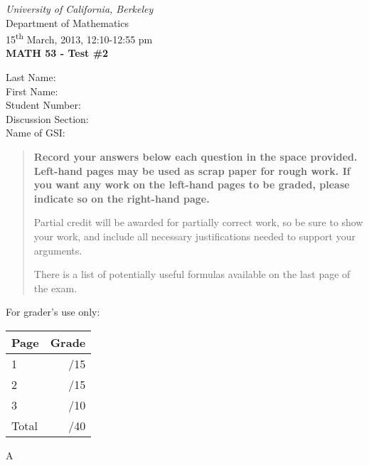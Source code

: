 \documentclass[12pt]{article}
\newcommand{\skipline}{\vspace{12pt}}
\begin{document}
\author{Instructor: Sean Fitzpatrick}
\thispagestyle{plain}
\begin{center}
\emph{University of California, Berkeley}\\
Department of Mathematics\\
15\textsuperscript{th} March, 2013, 12:10-12:55 pm\\
{\bf MATH 53 - Test \#2}\\
\end{center}
\skipline \skipline \skipline \noindent \skipline
Last Name:\underline{\hspace{350pt}}\\
\skipline
First Name:\underline{\hspace{348pt}}\\
\skipline
Student Number:\underline{\hspace{322pt}}\\
\skipline
Discussion Section: \underline{\hspace{307pt}}\\
\skipline
Name of GSI: \underline{\hspace{336pt}}\\

\vspace{0.5in}


\begin{quote}
 {\bf Record your answers below each question in the space provided.    Left-hand pages may be used as scrap paper for rough work.  If you want any work on the left-hand pages to be graded, please indicate so on the right-hand page.
 
 \bigskip
 
Partial credit will be awarded for partially correct work, so be sure to show your work, and include all necessary justifications needed to support your arguments. 

There is a list of potentially useful formulas available on the last page of the exam.}
\end{quote}


\vspace{0.5in}

For grader's use only:

\begin{table}[hbt]
\begin{center}
\begin{tabular}{|l|r|} \hline
Page&Grade\\
\hline \hline
\cline{1-2} 1 & \enspace\enspace\enspace\enspace\enspace\enspace/15\\
\cline{1-2} 2 & \enspace\enspace\enspace\enspace\enspace\enspace/15\\
\cline{1-2} 3 & \enspace\enspace\enspace\enspace\enspace\enspace/10\\
\cline{1-2} Total & \enspace\enspace\enspace\enspace\enspace\enspace/40\\
\hline
\end{tabular}

\skipline

\skipline

\skipline

A
\end{center}
\end{table}
\newpage
\end{document}
